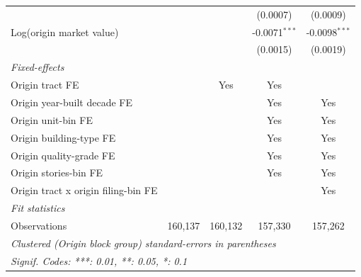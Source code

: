 \begin{tabular}{lcccc}
                                                  &                &               & (0.0007)        & (0.0009)\\   
   Log(origin market value)                       &                &               & -0.0071$^{***}$ & -0.0098$^{***}$\\   
                                                  &                &               & (0.0015)        & (0.0019)\\   
   \midrule
   \emph{Fixed-effects}\\
   Origin tract FE                                &                & Yes           & Yes             & \\  
   Origin year-built decade FE                    &                &               & Yes             & Yes\\  
   Origin unit-bin FE                             &                &               & Yes             & Yes\\  
   Origin building-type FE                        &                &               & Yes             & Yes\\  
   Origin quality-grade FE                        &                &               & Yes             & Yes\\  
   Origin stories-bin FE                          &                &               & Yes             & Yes\\  
   Origin tract x origin filing-bin FE            &                &               &                 & Yes\\  
   \midrule
   \emph{Fit statistics}\\
   Observations                                   & 160,137        & 160,132       & 157,330         & 157,262\\  
   \midrule \midrule
   \multicolumn{5}{l}{\emph{Clustered (Origin block group) standard-errors in parentheses}}\\
   \multicolumn{5}{l}{\emph{Signif. Codes: ***: 0.01, **: 0.05, *: 0.1}}\\
\end{tabular}
\par\endgroup
